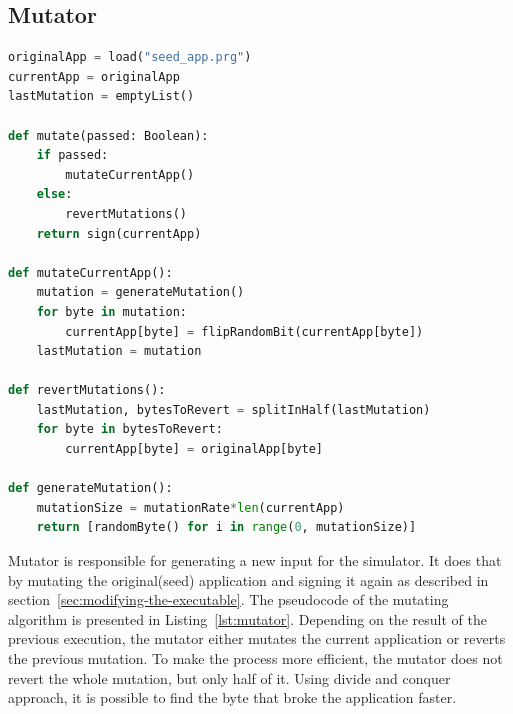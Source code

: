 \subsection*{Mutator}
\begin{lstlisting}[caption={Pseudocode of the mutating algorithm},captionpos=b,label={lst:mutator},language=Python]
originalApp = load("seed_app.prg")
currentApp = originalApp
lastMutation = emptyList()

def mutate(passed: Boolean):
    if passed:
        mutateCurrentApp()
    else:
        revertMutations()
    return sign(currentApp)

def mutateCurrentApp():
    mutation = generateMutation()
    for byte in mutation:
        currentApp[byte] = flipRandomBit(currentApp[byte])
    lastMutation = mutation

def revertMutations():
    lastMutation, bytesToRevert = splitInHalf(lastMutation)
    for byte in bytesToRevert:
        currentApp[byte] = originalApp[byte]

def generateMutation():
    mutationSize = mutationRate*len(currentApp)
    return [randomByte() for i in range(0, mutationSize)]
\end{lstlisting}

Mutator is responsible for generating a new input for the simulator.
It does that by mutating the original(seed) application and signing it again as described in section~\ref{sec:modifying-the-executable}.
The pseudocode of the mutating algorithm is presented in Listing~\ref{lst:mutator}.
Depending on the result of the previous execution, the mutator either mutates the current application or reverts the previous mutation.
To make the process more efficient, the mutator does not revert the whole mutation, but only half of it.
Using divide and conquer approach, it is possible to find the byte that broke the application faster.


